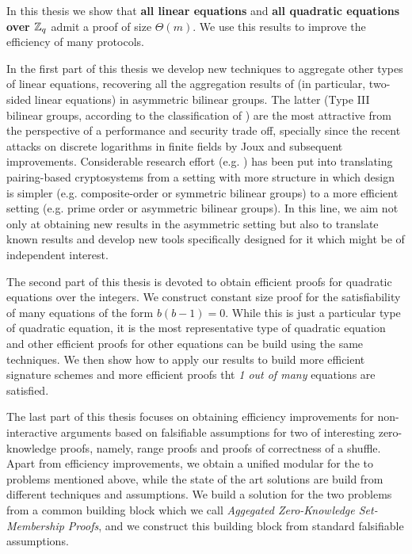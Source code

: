 In this thesis we show that \textbf{all linear equations} and \textbf{all quadratic equations over $\mathbb{Z}_q$} admit a proof of size $\Theta(m)$.  We use this results to improve the efficiency of many protocols. 

In the first part of this thesis we develop new techniques to aggregate 
other types of linear equations, recovering all the aggregation results of \cite{C:JutRoy14} (in particular, two-sided linear equations) in asymmetric bilinear groups. The latter (Type III bilinear groups, according to the classification of \cite{DAM:GalPatSma08}) are the most 
attractive 
from the perspective of a performance and security trade off, specially since the recent attacks on discrete logarithms in finite fields by Joux \cite{SAC:Joux13} and subsequent improvements. Considerable research effort 
(e.g. \cite{C:AGOT14a,EC:Freeman10})
has been put into translating pairing-based cryptosystems from a setting with more structure in which design is simpler (e.g. composite-order or symmetric bilinear groups) to a more efficient setting (e.g. prime order or asymmetric bilinear groups). In this line, we aim not only at obtaining new results in the asymmetric setting but also to translate known results and develop new tools specifically designed for it which might be of independent interest.

The second part of this thesis is devoted to obtain efficient proofs for quadratic equations over the integers. We construct constant size proof for the satisfiability of many equations of the form $b(b-1)=0$. While this is just a particular type of quadratic equation, it is the most representative type of quadratic equation and other efficient proofs for other equations can be build using the same techniques. We then show how to apply our results to build more efficient signature schemes and more efficient proofs tht \emph{1 out of many} equations are satisfied.

The last part of this thesis focuses on obtaining efficiency improvements for non-interactive arguments based on falsifiable assumptions for two of interesting zero-knowledge proofs, namely, range proofs and proofs of correctness of a shuffle. Apart from efficiency improvements, we obtain a unified modular for the to problems mentioned above, while the state of the art solutions are build from different techniques and assumptions. We build a solution for the two problems from a common building block which we call \emph{Aggegated Zero-Knowledge Set-Membership Proofs}, and we construct this building block from standard falsifiable assumptions.


